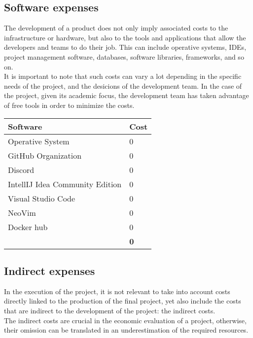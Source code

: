\documentclass[../memory.tex]{subfiles}
\begin{document}
\subsection{Software expenses}
The development of a product does not only imply associated costs to the
infrastructure or hardware, but also to the tools and applications that allow
the developers and teams to do their job. This can include operative systems,
IDEs, project management software, databases, software libraries, frameworks,
and so on.
\\
It is important to note that such costs can vary a lot depending in the specific
needs of the project, and the desicions of the development team. In the case of
the project, given its academic focus, the development team has taken advantage
of free tools in order to minimize the costs.
\\[12pt]
\begin{tabularx}{\textwidth}{|X|X|}
	\hline
	\rowcolor{rowColor}
	Software                        & Cost                \\
	\hline
	Operative System                & 0\texteuro          \\
	\hline
	GitHub Organization             & 0\texteuro          \\
	\hline
	Discord                         & 0\texteuro          \\
	\hline
	IntellIJ Idea Community Edition & 0\texteuro          \\
	\hline
	Visual Studio Code              & 0\texteuro          \\
	\hline
	NeoVim                          & 0\texteuro          \\
	\hline
	Docker hub                      & 0\texteuro          \\
	\hline
	\multicolumn{1}{X|}{}           & \textbf{0\texteuro} \\
	\cline{2-2}
\end{tabularx}
\subsection{Indirect expenses}
In the execution of the project, it is not relevant to take into account costs
directly linked to the production of the final project, yet also include the
costs that are indirect to the development of the project: the indirect costs.
\\[8pt]
The indirect costs are crucial in the economic evaluation of a project,
otherwise, their omission can be translated in an underestimation of the
required resources.
\end{document}
